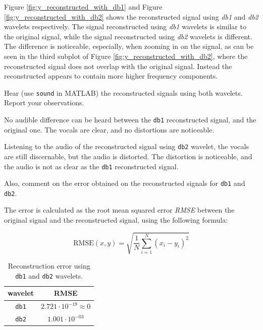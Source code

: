 Figure \ref{fig:y_reconstructed_with_db1} and Figure \ref{fig:y_reconstructed_with_db2} shows the reconstructed signal using \textit{db1} and \textit{db2} wavelets respectively. The signal reconstructed using \textit{db1} wavelets is similar to the original signal, while the signal reconstructed using \textit{db2} wavelets is different. The difference is noticeable, especially, when zooming in on the signal, as can be seen in the third subplot of Figure \ref{fig:y_reconstructed_with_db2}, where the reconstructed signal does not overlap with the original signal. Instead the reconstructed appears to contain more higher frequency components. 


\begin{tcolorbox}[colback=red!5!white,colframe=red!75!black,title=Problem 1.c]
    Hear (use \verb|sound| in MATLAB) the reconstructed signals using both wavelets.
    Report your observations.
\end{tcolorbox}

No audible difference can be heard between the \texttt{db1} reconstructed signal, and the original one. The vocals are clear, and no distortions are noticeable.

Listening to the audio of the reconstructed signal using \texttt{db2} wavelet, the vocals are still discernable, but the audio is distorted. The distortion is noticeable, and the audio is not as clear as the \texttt{db1} reconstructed signal.


\begin{tcolorbox}[colback=red!5!white,colframe=red!75!black,title=Problem 1.d]
    Also, comment on the error obtained on the reconstructed signals for \verb|db1| and \verb|db2|.
\end{tcolorbox}

The error is calculated as the root mean squared error \textit{RMSE} between the original signal and the reconstructed signal, using the following formula:

\begin{equation}
    \text{RMSE}(x,y) = \sqrt{\frac{1}{N}\sum_{i=1}^{N}(x_i - y_{i})^2}
\end{equation}

\begin{table}[H]
    \label{tbl:reconstruction_error_with_db1_and_db2}
    \centering

    \begin{tabular}{c|c}
        \hline
        wavelet & RMSE \\
        \hline
        \texttt{db1} & $2.721 \cdot 10^{-19} \approx 0 $ \\
        \texttt{db2} & $1.001 \cdot 10^{-03}$ \\
    \end{tabular}

    \caption{Reconstruction error using \texttt{db1} and \texttt{db2} wavelets.}
\end{table}



